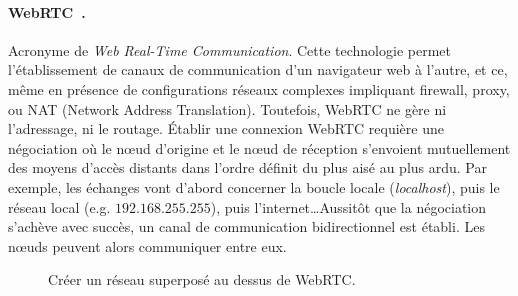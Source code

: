 \paragraph{WebRTC~\cite{webrtc}.} Acronyme de \emph{Web Real-Time
  Communication}.  Cette technologie permet l'établissement de canaux de
communication d'un navigateur web à l'autre, et ce, même en présence de
configurations réseaux complexes impliquant firewall, proxy, ou NAT (Network
Address Translation). Toutefois, WebRTC ne gère ni l'adressage, ni le routage.
Établir une connexion WebRTC requière une négociation où le nœud d'origine et le
nœud de réception s'envoient mutuellement des moyens d'accès distants dans
l'ordre définit du plus aisé au plus ardu. Par exemple, les échanges vont
d'abord concerner la boucle locale (\emph{localhost}), puis le réseau local
(e.g. $192.168.255.255$), puis l'internet\ldots Aussitôt que la négociation
s'achève avec succès, un canal de communication bidirectionnel est établi. Les
nœuds peuvent alors communiquer entre eux.

\begin{figure*}
  \begin{center}
    \hspace{5pt}
    \hspace{5pt}
    \caption[Création d'un réseau superposé sur WebRTC]
    {\label{fig:webrtc}Créer un réseau superposé au dessus de WebRTC.}
  \end{center}
\end{figure*}

